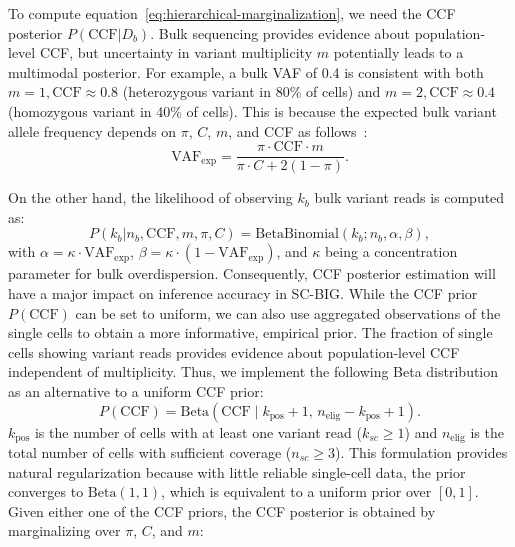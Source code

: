 \documentclass[10pt]{article}
\begin{document}
To compute equation~\eqref{eq:hierarchical-marginalization}, we need the CCF posterior $P(\text{CCF} | D_b)$.
Bulk sequencing provides evidence about population-level CCF, but uncertainty in variant multiplicity $m$ potentially leads to a multimodal posterior.
For example, a bulk VAF of 0.4 is consistent with both $m=1, \text{CCF} \approx 0.8$ (heterozygous variant in 80\% of cells) and $m=2, \text{CCF} \approx 0.4$ (homozygous variant in 40\% of cells).
This is because the expected bulk variant allele frequency depends on $\pi$, $C$, $m$, and CCF as follows~\cite{tarabichi2021}:
\begin{equation}
    \text{VAF}_{\text{exp}} = \frac{
        \pi \cdot \text{CCF} \cdot m
    }{
        \pi \cdot C + 2 (1-\pi)
    }
    .
\label{eq:vaf-expected}
\end{equation}

On the other hand, the likelihood of observing $k_b$ bulk variant reads is computed as:
\begin{equation}
    P(k_b | n_b, \text{CCF}, m, \pi, C) = \text{BetaBinomial}(k_b; n_b, \alpha, \beta)
    ,
\end{equation}
with $\alpha = \kappa \cdot \text{VAF}_{\text{exp}}$, $\beta = \kappa \cdot (1-\text{VAF}_{\text{exp}})$, and $\kappa$ being a concentration parameter for bulk overdispersion.
Consequently, CCF posterior estimation will have a major impact on inference accuracy in SC-BIG.
While the CCF prior $P(\text{CCF})$ can be set to uniform, we can also use aggregated observations of the single cells to obtain a more informative, empirical prior.
The fraction of single cells showing variant reads provides evidence about population-level CCF independent of multiplicity.
Thus, we implement the following Beta distribution as an alternative to a uniform CCF prior:
\begin{equation}
    P(\text{CCF}) = \text{Beta}(\text{CCF} \mid k_{\text{pos}} + 1, \, n_{\text{elig}} - k_{\text{pos}} + 1)
    .
\label{eq:ccf-prior}
\end{equation}
$k_{\text{pos}}$ is the number of cells with at least one variant read ($k_{sc} \geq 1$) and $n_{\text{elig}}$ is the total number of cells with sufficient coverage ($n_{sc} \geq 3$).
This formulation provides natural regularization because with little reliable single-cell data, the prior converges to $\text{Beta}(1, 1)$, which is equivalent to a uniform prior over $[0, 1]$.
Given either one of the CCF priors, the CCF posterior is obtained by marginalizing over $\pi$, $C$, and $m$:
\end{document}
